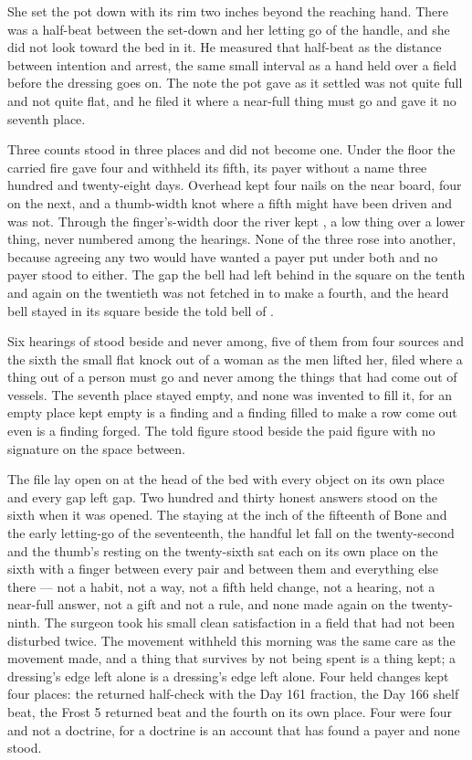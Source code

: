 She set the pot down with its rim two inches beyond the reaching hand. There was a half-beat between the set-down and her letting go of the handle, and she did not look toward the bed in it. He measured that half-beat as the distance between intention and arrest, the same small interval as a hand held over a field before the dressing goes on. The note the pot gave as it settled was not quite full and not quite flat, and he filed it where a near-full thing must go and gave it no seventh place.

\scenebreak

Three counts stood in three places and did not become one. Under the floor the carried fire gave four and withheld its fifth, its payer without a name three hundred and twenty-eight days. Overhead  kept four nails on the near board, four on the next, and a thumb-width knot where a fifth might have been driven and was not. Through the finger's-width door the river kept , a low thing over a lower thing, never numbered among the hearings. None of the three rose into another, because agreeing any two would have wanted a payer put under both and no payer stood to either. The gap the bell had left behind in the square on the tenth and again on the twentieth was not fetched in to make a fourth, and the heard bell stayed in its square beside the told bell of .

Six hearings of  stood beside and never among, five of them from four sources and the sixth the small flat knock out of a woman as the men lifted her, filed where a thing out of a person must go and never among the things that had come out of vessels. The seventh place stayed empty, and none was invented to fill it, for an empty place kept empty is a finding and a finding filled to make a row come out even is a finding forged. The told figure stood beside the paid figure with no signature on the space between.

The file lay open on  at the head of the bed with every object on its own place and every gap left gap. Two hundred and thirty honest answers stood on the sixth when it was opened. The staying at the inch of the fifteenth of Bone and the early letting-go of the seventeenth, the handful let fall on the twenty-second and the thumb's resting on the twenty-sixth sat each on its own place on the sixth with a finger between every pair and between them and everything else there --- not a habit, not a way, not a fifth held change, not a hearing, not a near-full answer, not a gift and not a rule, and none made again on the twenty-ninth. The surgeon took his small clean satisfaction in a field that had not been disturbed twice. The movement withheld this morning was the same care as the movement made, and a thing that survives by not being spent is a thing kept; a dressing's edge left alone is a dressing's edge left alone. Four held changes kept four places: the returned half-check with the Day 161 fraction, the Day 166 shelf beat, the Frost 5 returned beat and the fourth on its own place. Four were four and not a doctrine, for a doctrine is an account that has found a payer and none stood.

